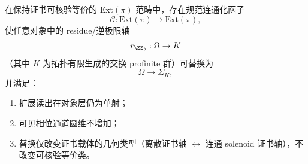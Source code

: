 \begin{conjecture}\label{conj:conclusion-extpi-connectedization-no-cdim-increase}
在保持证书可核验等价的 Ext\((\pi)\) 范畴中，存在规范连通化函子
\[
\mathcal C:\mathrm{Ext}(\pi)\to \mathrm{Ext}(\pi),
\]
使任意对象中的 residue/逆极限轴
\[
r_{\ZZ_b}:\Omega\to K
\]
（其中 \(K\) 为拓扑有限生成的交换 profinite 群）可替换为
\[
\Omega\to \Sigma_K,
\]
并满足：
\begin{enumerate}
  \item 扩展读出在对象层仍为单射；
  \item 可见相位通道圆维不增加；
  \item 替换仅改变证书载体的几何类型（离散证书轴 \(\leftrightarrow\) 连通 solenoid 证书轴），不改变可核验等价类。
\end{enumerate}
\end{conjecture}
